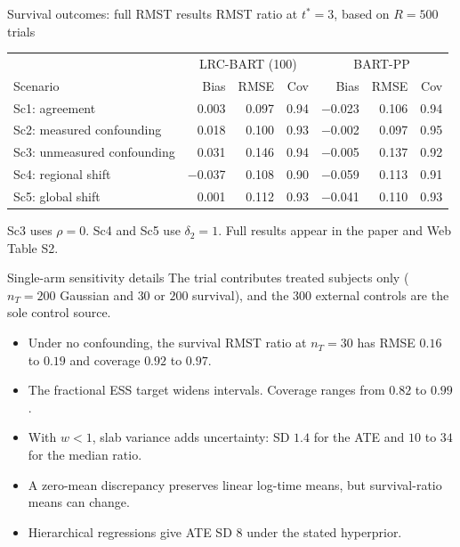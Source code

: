 \documentclass[11pt,aspectratio=169]{beamer}
\begin{document}
\begin{frame}{Survival outcomes: full RMST results}
  \centering
  \small
  RMST ratio at $t^\ast=3$, based on $R=500$ trials

  \vspace{0.25em}
  \setlength{\tabcolsep}{5.5pt}
  \renewcommand{\arraystretch}{1.02}
  \begin{tabular}{lrrr|rrr}
    \toprule
    & \multicolumn{3}{c|}{LRC-BART (100)} & \multicolumn{3}{c}{BART-PP} \\
    Scenario & Bias & RMSE & Cov & Bias & RMSE & Cov \\
    \midrule
    Sc1: agreement & 0.003 & 0.097 & 0.94 & $-$0.023 & 0.106 & 0.94 \\
    Sc2: measured confounding & 0.018 & 0.100 & 0.93 & $-$0.002 & 0.097 & 0.95 \\
    Sc3: unmeasured confounding & 0.031 & 0.146 & 0.94 & $-$0.005 & 0.137 & 0.92 \\
    Sc4: regional shift & $-$0.037 & 0.108 & 0.90 & $-$0.059 & 0.113 & 0.91 \\
    Sc5: global shift & 0.001 & 0.112 & 0.93 & $-$0.041 & 0.110 & 0.93 \\
    \bottomrule
  \end{tabular}

  \vspace{0.65em}
  {\small Sc3 uses $\rho=0$. Sc4 and Sc5 use $\delta_2=1$. Full results appear in the paper and Web Table S2.}
\end{frame}

\begin{frame}{Single-arm sensitivity details}
  \small
  The trial contributes treated subjects only ($n_T=200$ Gaussian and $30$ or $200$ survival), and the 300 external controls are the sole control source.

  \vspace{0.5em}
  \begin{itemize}\setlength\itemsep{0.5em}
    \item Under no confounding, the survival RMST ratio at $n_T=30$ has RMSE $0.16$ to $0.19$ and coverage $0.92$ to $0.97$.
    \item The fractional ESS target widens intervals. Coverage ranges from $0.82$ to $0.99$.
    \item With $w<1$, slab variance adds uncertainty: SD $1.4$ for the ATE and $10$ to $34$ for the median ratio.
    \item A zero-mean discrepancy preserves linear log-time means, but survival-ratio means can change.
    \item Hierarchical regressions give ATE SD $8$ under the stated hyperprior.
  \end{itemize}
\end{frame}
\end{document}
